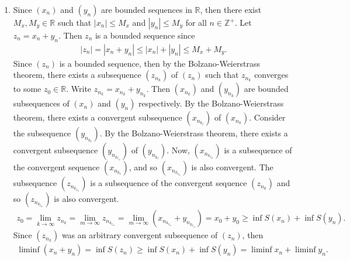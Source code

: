 \documentclass[11pt]{amsart}
\theoremstyle{plain}
\numberwithin{equation}{section}
\begin{document}
\begin{enumerate}[label=\textbf{(\roman*)}]
    \itemsep 0em
    \item Since $\left(x_{n}\right)$ and $\left(y_{n}\right)$ are bounded sequences in $\mathbb{R}$, then there exist $M_{x},M_{y}\in\mathbb{R}$ such that $\left|x_{n}\right|\leq M_{x}$ and $\left|y_{n}\right|\leq M_{y}$ for all $n\in\mathbb{Z}^{+}$. Let $z_{n}=x_{n}+y_{n}$. Then $z_{n}$ is a bounded sequence since
\begin{align*}
    \left|z_{n}\right|=\left|x_{n}+y_{n}\right|\leq\left|x_{n}\right|+\left|y_{n}\right|\leq M_{x}+M_{y}.
\end{align*}
 Since $\left(z_{n}\right)$ is a bounded sequence, then by the Bolzano-Weierstrass theorem, there exists a subsequence $\left(z_{n_{k}}\right)$ of $\left(z_{n}\right)$ such that $z_{n_{k}}$ converges to some $z_{0}\in\mathbb{R}$. Write $z_{n_{k}}=x_{n_{k}}+y_{n_{k}}$. Then $\left(x_{n_{k}}\right)$ and $\left(y_{n_{k}}\right)$ are bounded subsequences of $\left(x_{n}\right)$ and $\left(y_{n}\right)$ respectively. By the Bolzano-Weierstrass theorem, there exists a convergent subsequence $\left(x_{n_{k_{\ell}}}\right)$ of $\left(x_{n_{k}}\right)$. Consider the subsequence $\left(y_{n_{k_{\ell}}}\right)$. By the Bolzano-Weierstrass theorem, there exists a convergent subsequence $\left(y_{n_{k_{\ell_{m}}}}\right)$ of $\left(y_{n_{k_{\ell}}}\right)$. Now, $\left(x_{n_{k_{\ell_{m}}}}\right)$ is a subsequence of the convergent sequence $\left(x_{n_{k_{\ell}}}\right)$, and so $\left(x_{n_{k_{\ell_{m}}}}\right)$ is also convergent. The subsequence $\left(z_{n_{k_{\ell_{m}}}}\right)$ is a subsequence of the convergent sequence $\left(z_{n_{k}}\right)$ and so $\left(z_{n_{k_{\ell_{m}}}}\right)$ is also convergent. 
\begin{align*}
z_{0}=\lim_{k\to\infty}z_{n_{k}}=\lim_{m\to\infty}z_{n_{k_{\ell_{m}}}}=\lim_{m\to\infty}\left(x_{n_{k_{\ell_{m}}}}+y_{n_{k_{\ell_{m}}}}\right)=x_{0}+y_{0}\geq\inf S\left(x_{n}\right)+\inf S\left(y_{n}\right).
\end{align*}
Since $\left(z_{n_{k}}\right)$ was an arbitrary convergent subsequence of $\left(z_{n}\right)$, then 
\begin{align*}
\liminf\left(x_{n}+y_{n}\right)=\inf S\left(z_{n}\right)\geq\inf S\left(x_{n}\right)+\inf S\left(y_{n}\right)=\liminf x_{n}+\liminf y_{n}.
\end{align*}

\end{enumerate}
\end{document}
